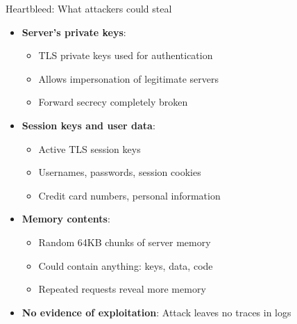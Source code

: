 \documentclass[aspectratio=169, lualatex, handout]{beamer}
\begin{document}
\begin{frame}{Heartbleed: What attackers could steal}
	\begin{itemize}
		\item \textbf{Server's private keys}:
		      \begin{itemize}
			      \item TLS private keys used for authentication
			      \item Allows impersonation of legitimate servers
			      \item Forward secrecy completely broken
		      \end{itemize}
		\item \textbf{Session keys and user data}:
		      \begin{itemize}
			      \item Active TLS session keys
			      \item Usernames, passwords, session cookies
			      \item Credit card numbers, personal information
		      \end{itemize}
		\item \textbf{Memory contents}:
		      \begin{itemize}
			      \item Random 64KB chunks of server memory
			      \item Could contain anything: keys, data, code
			      \item Repeated requests reveal more memory
		      \end{itemize}
		\item \textbf{No evidence of exploitation}: Attack leaves no traces in logs
	\end{itemize}
\end{frame}
\end{document}

